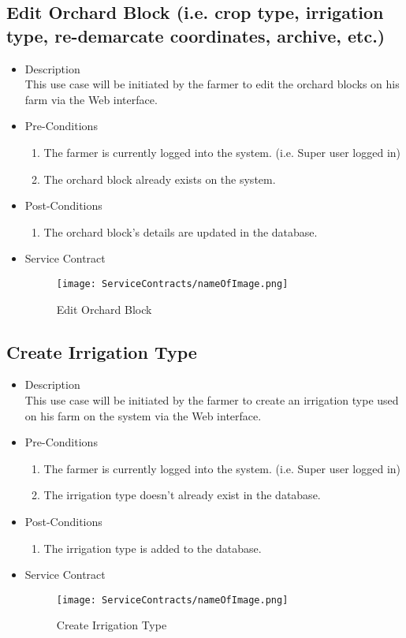 \documentclass[11pt,fleqn]{book} %
\begin{document}
\subsection{Edit Orchard Block (i.e. crop type, irrigation type, re-demarcate coordinates, archive, etc.)}
\begin{itemize}
	\item Description\\
	This use case will be initiated by the farmer to edit the orchard blocks on his farm via the Web interface.
	\item Pre-Conditions
	\begin{enumerate}
		\item The farmer is currently logged into the system. (i.e. Super user logged in)
		\item The orchard block already exists on the system.				
	\end{enumerate}
	\item Post-Conditions
	\begin{enumerate}
		\item The orchard block’s details are updated in the database.
	\end{enumerate}
	\item Service Contract
	\begin{figure}
		\texttt{[image: ServiceContracts/nameOfImage.png]}
		\caption{Edit Orchard Block}
	\end{figure}
\end{itemize}

\subsection{Create Irrigation Type}
\begin{itemize}
	\item Description\\
	This use case will be initiated by the farmer to create an irrigation type used on his farm on the system via the Web interface.
	\item Pre-Conditions
	\begin{enumerate}
		\item The farmer is currently logged into the system. (i.e. Super user logged in)
		\item The irrigation type doesn’t already exist in the database. 
	\end{enumerate}
	\item Post-Conditions
	\begin{enumerate}
		\item The irrigation type is added to the database.	
	\end{enumerate}
	\item Service Contract
	\begin{figure}
		\texttt{[image: ServiceContracts/nameOfImage.png]}
		\caption{Create Irrigation Type}
	\end{figure}
\end{itemize}
\end{document}
